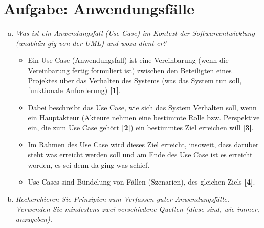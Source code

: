 

\newcommand{\dozent}{Lutz Prechelt}
\newcommand{\tutor}{Samuel Domiks}
\newcommand{\tutoriumNo}{02\\Materialien: Latex, Skript}
\newcommand{\ubungNo}{05}
\newcommand{\veranstaltung}{Softwaretechnik}
\newcommand{\semester}{SoSe21}
\newcommand{\studenten}{Jonny Lam \& Thore Brehmer}





\section{Aufgabe: Anwendungsfälle}
\begin{enumerate}[a)]
    \item {\itshape Was ist ein Anwendungsfall (Use Case) im Kontext der Softwareentwicklung (unabhän-gig von der UML) und wozu dient er?}
    \begin{itemize}
        \item Ein Use Case (Anwendungsfall) ist eine Vereinbarung (wenn die Vereinbarung fertig formuliert ist) zwischen den Beteiligten eines Projektes über das Verhalten des Systems (was das System tun soll, funktionale Anforderung) \textbf{[1]}.
        \item Dabei beschreibt das Use Case, wie sich das System Verhalten soll, wenn ein Hauptakteur (Akteure nehmen eine bestimmte Rolle bzw. Perspektive ein, die zum Use Case gehört \textbf{[2]}) ein bestimmtes Ziel erreichen will \textbf{[3]}.
        \item Im Rahmen des Use Case wird dieses Ziel erreicht, insoweit, dass darüber steht was erreicht werden soll und am Ende des Use Case ist es erreicht worden, es sei denn da ging was schief.
        \item Use Cases sind Bündelung von Fällen (Szenarien), des gleichen Ziels \textbf{[4]}.

    \end{itemize}
    
    
    \item {\itshape Recherchieren Sie Prinzipien zum Verfassen guter Anwendungsfälle. Verwenden Sie mindestens zwei verschiedene Quellen (diese sind, wie immer, anzugeben).}
    \begin{enumerate}[1.]
    

\end{enumerate}
\end{enumerate}
